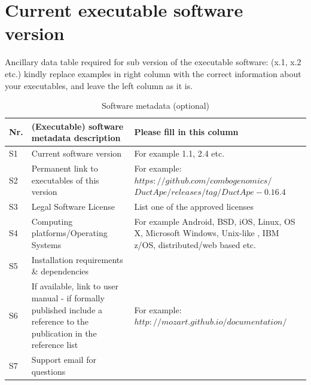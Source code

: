 \documentclass[preprint,12pt, a4paper]{elsarticle}
\newcommand{\1}{{\rm 1\hspace{-0.9mm}l}}
\begin{document}
\section*{Current executable software version}
\label{}

Ancillary data table required for sub version of the executable software: (x.1, 
x.2 etc.) kindly replace examples in right column with the correct information 
about your executables, and leave the left column as it is.

\begin{table}[!h]
\begin{tabular}{|l|p{6.5cm}|p{6.5cm}|}
\hline
\textbf{Nr.} & \textbf{(Executable) software metadata description} & 
\textbf{Please fill in this column} \\
\hline
S1 & Current software version & For example 1.1, 2.4 etc. \\
\hline
S2 & Permanent link to executables of this version  & For example: 
$https://github.com/combogenomics/$ $DuctApe/releases/tag/DuctApe-0.16.4$ \\
\hline
S3 & Legal Software License & List one of the approved licenses \\
\hline
S4 & Computing platforms/Operating Systems & For example Android, BSD, iOS, 
Linux, OS X, Microsoft Windows, Unix-like , IBM z/OS, distributed/web based 
etc. \\
\hline
S5 & Installation requirements \& dependencies & \\
\hline
S6 & If available, link to user manual - if formally published include a 
reference to the publication in the reference list & For example: 
$http://mozart.github.io/documentation/$ \\
\hline
S7 & Support email for questions & \\
\hline
\end{tabular}
\caption{Software metadata (optional)}
\label{} 
\end{table}
\end{document}
